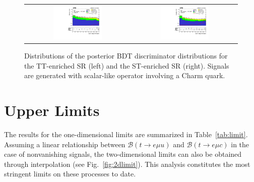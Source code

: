 \begin{figure}[tbh!]
 \begin{center}
 \begin{tabular}{cc}
  \includegraphics[width=0.48\textwidth]{figures/Part3/Results/BDT_TT_ScalarC}&
  \includegraphics[width=0.48\textwidth]{figures/Part3/Results/BDT_ST_ScalarC}\\
 \end{tabular}
 \caption{Distributions of the posterior BDT discriminator distributions for the TT-enriched SR (left) and the ST-enriched SR (right). Signals are generated with scalar-like operator involving a Charm quark.}
 \label{fig:bdt_postfit_ScalarC}
 \end{center}
\end{figure} 
\section{Upper Limits}
\label{sec:Limits}

The results for the one-dimensional limits are summarized in Table~\ref{tab:limit}. Assuming a linear relationship between $\mathcal{B}(t \rightarrow e\mu u)$ and $\mathcal{B}(t \rightarrow e\mu c)$ in the case of nonvanishing signals, the two-dimensional limits can also be obtained through interpolation (see Fig.~\ref{fig:2dlimit}). This analysis constitutes the most stringent limits on these processes to date.

